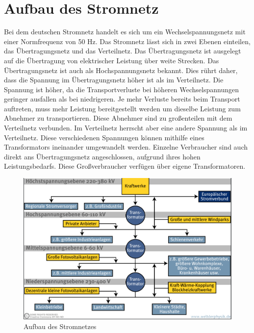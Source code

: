 \section{Aufbau des Stromnetz}
Bei dem deutschen Stromnetz handelt es sich um ein Wechselspannungsnetz mit einer Normfrequenz von 50 Hz. Das Stromnetz lässt sich in zwei Ebenen einteilen, das Übertragungsnetz und das Verteilnetz. Das Übertragungsnetz ist ausgelegt auf die Übertragung von elektrischer Leistung über weite Strecken. Das Übertragungsnetz ist auch als Hochspannungsnetz bekannt. Dies rührt daher, dass die Spannung im Übertragungsnetz höher ist als im Verteilnetz. Die Spannung ist höher, da die Transportverluste bei höheren Wechselspannungen geringer ausfallen als bei niedrigeren. Je mehr Verluste bereits beim Transport auftreten, muss mehr Leistung bereitgestellt werden um dieselbe Leistung zum Abnehmer zu transportieren. Diese Abnehmer sind zu großenteilen mit dem Verteilnetz verbunden. Im Verteilnetz herrscht aber eine andere Spannung als im Verteilnetz. Diese verschiedenen Spannungen können mithilfe eines Transformators ineinander umgewandelt werden. Einzelne Verbraucher sind auch direkt ans Übertragungsnetz angeschlossen, aufgrund ihres hohen Leistungsbedarfs. Diese Großverbraucher verfügen über eigene Transformatoren.
\begin{figure}[h!]
	\includegraphics[width=\linewidth]{img/Stromnetz1.png}
	\caption{Aufbau des Stromnetzes}
	\label{Abb1_Stromnetz}
\end{figure}


